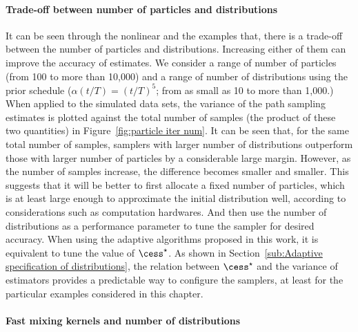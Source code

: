 \paragraph{Trade-off between number of particles and distributions}



It can be seen through the nonlinear \ode and the \pet examples that, there is
a trade-off between the number of particles and distributions. Increasing
either of them can improve the accuracy of estimates. We consider a range of
number of particles (from 100 to more than 10,000) and a range of number of
distributions using the prior schedule ($\alpha(t/T) = (t/T)^5$; from as small
as 10 to more than 1,000.) When applied to the simulated data sets, the
variance of the path sampling estimates is plotted against the total number of
samples (the product of these two quantities) in Figure~\ref{fig:particle iter
  num}. It can be seen that, for the same total number of samples, samplers
with larger number of distributions outperform those with larger number of
particles by a considerable large margin. However, as the number of samples
increase, the difference becomes smaller and smaller. This suggests that it
will be better to first allocate a fixed number of particles, which is at
least large enough to approximate the initial distribution well, according to
considerations such as computation hardwares. And then use the number of
distributions as a performance parameter to tune the sampler for desired
accuracy. When using the adaptive algorithms proposed in this work, it is
equivalent to tune the value of $\cess^\star$. As shown in
Section~\ref{sub:Adaptive specification of distributions}, the relation
between $\cess^\star$ and the variance of estimators provides a predictable
way to configure the samplers, at least for the particular examples considered
in this chapter.

\paragraph{Fast mixing \mcmc kernels and number of distributions}

